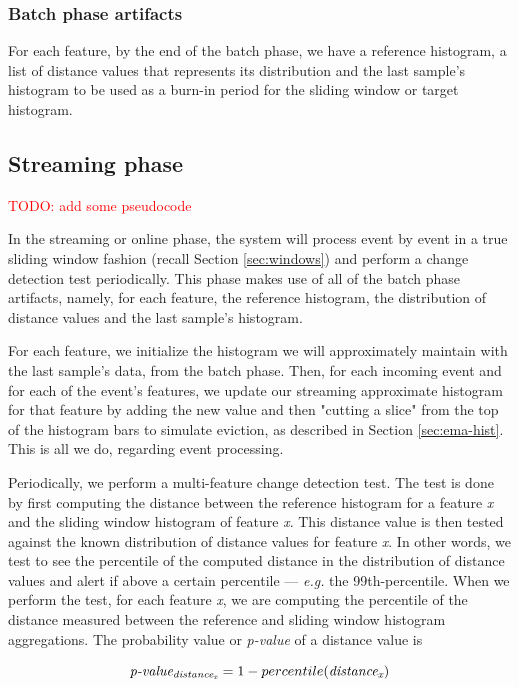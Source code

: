 \subsubsection*{Batch phase artifacts}
For each feature, by the end of the batch phase, we have a reference histogram, a list of distance values that represents its distribution and the last sample's histogram to be used as a burn-in period for the sliding window or target histogram.

\subsection{Streaming phase} \label{sec:stream-phase}
\textcolor{red}{TODO: add some pseudocode}

In the streaming or online phase, the system will process event by event in a true sliding window fashion (recall Section \ref{sec:windows}) and perform a change detection test periodically. This phase makes use of all of the batch phase artifacts, namely, for each feature, the reference histogram, the distribution of distance values and the last sample's histogram.

For each feature, we initialize the histogram we will approximately maintain with the last sample's data, from the batch phase. Then, for each incoming event and for each of the event's features, we update our streaming approximate histogram for that feature by adding the new value and then "cutting a slice" from the top of the histogram bars to simulate eviction, as described in Section \ref{sec:ema-hist}. This is all we do, regarding event processing.

Periodically, we perform a multi-feature change detection test. The test is done by first computing the distance between the reference histogram for a feature \textit{x} and the sliding window histogram of feature \textit{x}. This distance value is then tested against the known distribution of distance values for feature \textit{x}. In other words, we test to see the percentile of the computed distance in the distribution of distance values and alert if above a certain percentile --- \textit{e.g.} the 99th-percentile. When we perform the test, for each feature \textit{x}, we are computing the percentile of the distance measured between the reference and sliding window histogram aggregations. The probability value or \textit{p-value} of a distance value is 

\[\textit{p-value\textsubscript{distance\textsubscript{x}}} = 1 - percentile(\textit{distance\textsubscript{x}})\]

